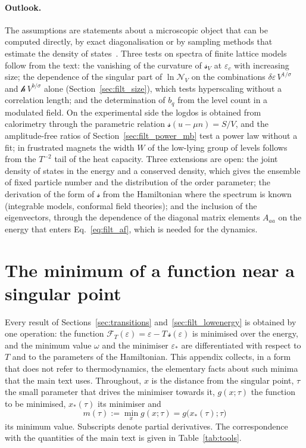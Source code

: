 \documentclass[10pt,a4paper]{article}
\theoremstyle{plain}
\newcommand{\cN}{\mathcal{N}}   %
\newcommand{\lndos}{{logdos}}  %
\newcommand{\hfield}{\mathscr{h}}  %
\newcommand{\Fen}[1][T]{\mathscr{F}_{#1}}  %
\newcommand{\lds}{\mathscr{s}}  %
\begin{document}
\paragraph{Outlook.} The assumptions are statements about a microscopic
object that can be computed directly, by exact diagonalisation or by
sampling methods that estimate the density of states~\cite{WangLandau2001}.
Three tests on spectra of finite lattice models follow from the text: the
vanishing of the curvature of $\lds_V$ at $\varepsilon_c$ with increasing
size; the dependence of the singular part of $\ln\cN_V$ on the combinations
$\delta\varepsilon\,V^{1/\sigma}$ and $\hfield\,V^{b/\sigma}$ alone
(Section~\ref{sec:filt_size}), which tests hyperscaling without a
correlation length; and the determination of $b_q$ from the level count in
a modulated field. On the experimental side the \lndos{} is obtained from
calorimetry through the parametric relation $\lds(u-\mu n)=S/V$, and the
amplitude-free ratios of Section~\ref{sec:filt_power_mb} test a power law
without a fit; in frustrated magnets the width $W$ of the low-lying group of
levels follows from the $T^{-2}$ tail of the heat capacity. Three extensions are
open: the joint density of states in the energy and a conserved density,
which gives the ensemble of fixed particle number and the distribution of
the order parameter; the derivation of the form of $\lds$ from the
Hamiltonian where the spectrum is known (integrable models, conformal field
theories); and the inclusion of the eigenvectors, through the dependence of
the diagonal matrix elements $A_{aa}$ on the energy that enters
Eq.~\eqref{eq:filt_af}, which is needed for the dynamics.

\clearpage
\appendix

\section{The minimum of a function near a singular point}
\label{sec:tools}

Every result of Sections~\ref{sec:transitions} and~\ref{sec:filt_lowenergy}
is obtained by one operation: the function
$\Fen(\varepsilon)=\varepsilon-T\,\lds(\varepsilon)$ is minimised over the
energy, and the minimum value $\omega$ and the minimiser $\varepsilon_*$ are
differentiated with respect to $T$ and to the parameters of the
Hamiltonian. This appendix collects, in a form that does not refer to
thermodynamics, the elementary facts about such minima that the main text
uses. Throughout, $x$ is the distance from the singular point, $\tau$ the
small parameter that drives the minimiser towards it, $g(x;\tau)$ the
function to be minimised, $x_*(\tau)$ its minimiser and
\begin{equation}\label{eq:tools_m}
  m(\tau):=\min_{x}g(x;\tau)=g\big(x_*(\tau);\tau\big)
\end{equation}
its minimum value. Subscripts denote partial derivatives. The correspondence
with the quantities of the main text is given in Table~\ref{tab:tools}.
\end{document}
